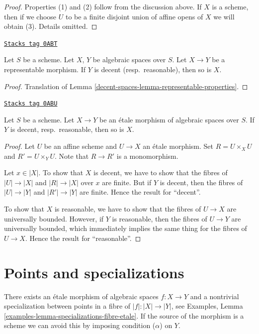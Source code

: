 \begin{proof}
\medskip\noindent
Properties (1) and (2) follow from the discussion above.
If $X$ is a scheme, then if we choose $U$ to be a finite
disjoint union of affine opens of $X$ we will obtain (3).
Details omitted.
\end{proof}

\begin{lemma}
\label{decent-spaces-lemma-representable-named-properties}
\href{https://stacks.math.columbia.edu/tag/0ABT}{\texttt{Stacks tag 0ABT}}

Let $S$ be a scheme. Let $X$, $Y$ be algebraic spaces over $S$.
Let $X \to Y$ be a representable morphism.
If $Y$ is decent (resp.\ reasonable), then so is $X$.
\end{lemma}

\begin{proof}
Translation of Lemma \ref{decent-spaces-lemma-representable-properties}.
\end{proof}

\begin{lemma}
\label{decent-spaces-lemma-etale-named-properties}
\href{https://stacks.math.columbia.edu/tag/0ABU}{\texttt{Stacks tag 0ABU}}

Let $S$ be a scheme. Let $X \to Y$ be an \'etale morphism of
algebraic spaces over $S$. If $Y$ is decent, resp.\ reasonable,
then so is $X$.
\end{lemma}

\begin{proof}
Let $U$ be an affine scheme and $U \to X$ an \'etale morphism.
Set $R = U \times_X U$ and $R' = U \times_Y U$. Note that
$R \to R'$ is a monomorphism.

\medskip\noindent
Let $x \in |X|$. To show that $X$ is decent, we have to show that
the fibres of $|U| \to |X|$ and $|R| \to |X|$ over $x$ are finite.
But if $Y$ is decent, then the fibres of $|U| \to |Y|$ and
$|R'| \to |Y|$ are finite. Hence the result for ``decent''.

\medskip\noindent
To show that $X$ is reasonable, we have to show that the fibres of
$U \to X$ are universally bounded. However, if $Y$ is reasonable,
then the fibres of $U \to Y$ are universally bounded, which immediately
implies the same thing for the fibres of $U \to X$.
Hence the result for ``reasonable''.
\end{proof}

\section{Points and specializations}
\label{decent-spaces-section-specializations}
There exists an \'etale morphism of algebraic spaces $f : X \to Y$
and a nontrivial specialization between points in a fibre of
$|f| : |X| \to |Y|$, see
Examples, Lemma \ref{examples-lemma-specializations-fibre-etale}.
If the source of the morphism is a scheme we can avoid this by
imposing condition ($\alpha$) on $Y$.


